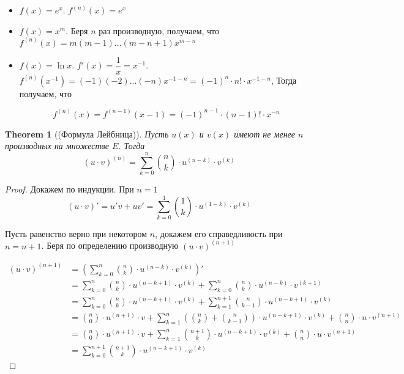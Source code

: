 \documentclass[a4paper]{article}
\theoremstyle{named}
\newtheorem*{namedtheorem}{Theorem}
\begin{document}
\begin{colloq}
\begin{itemize}
			\item
			$f(x) = e^x$. $f^{(n)}(x) = e^x$

			\item
			$f(x) = x^m$. Беря $n$ раз производную, получаем, что $f^{(n)}(x) = m(m - 1) \dots (m - n + 1)x^{m - n}$

			\item
			$f(x) = \ln x$. $f'(x) = \dfrac{1}{x} = x^{-1}$. $f^{(n)}(x^{-1}) = (-1)(-2)\dots(-n)x^{-1-n} = (-1)^n \cdot n! \cdot x^{-1 - n}$, Тогда получаем, что

			\begin{equation*}
				f^{(n)}(x) = f^{(n - 1)}(x - 1) = (-1)^{n - 1} \cdot (n - 1)! \cdot x^{-n}
			\end{equation*}
		\end{itemize}

		\begin{namedtheorem}[(Формула Лейбница)]
			Пусть $u(x)$ и $v(x)$ имеют не менее $n$ производных на множестве $E$. Тогда
			\begin{equation*}
				(u \cdot v)^{(n)} = \sum_{k = 0}^n \binom{n}{k} \cdot u^{(n - k)} \cdot v^{(k)}
			\end{equation*}
		\end{namedtheorem}

		\begin{proof}
			Докажем по индукции. При $n = 1$
			\begin{equation*}
				(u \cdot v)' = u'v + uv' = \sum_{k = 0}^1 \binom{1}{k} \cdot u^{(1 - k)} \cdot v^{(k)}
			\end{equation*}

			Пусть равенство верно при некотором $n$, докажем его справедливость при $n = n + 1$. Беря по определению производную $(u \cdot v)^{(n + 1)}$

			\begin{align*}
				(u \cdot v)^{(n + 1)} 
				&= \left(\sum_{k = 0}^n \binom{n}{k} \cdot u^{(n - k)} \cdot v^{(k)}\right)' \\
				&= \sum_{k = 0}^n \binom{n}{k} \cdot u^{(n - k + 1)} \cdot v^{(k)} + \sum_{k = 0}^n \binom{n}{k} \cdot u^{(n - k)} \cdot v^{(k + 1)} \\
				&= \sum_{k = 0}^n \binom{n}{k} \cdot u^{(n - k + 1)} \cdot v^{(k)} + \sum_{k = 1}^{n + 1} \binom{n}{k - 1} \cdot u^{(n - k + 1)} \cdot v^{(k)} \\
				&= \binom{n}{0} \cdot u^{(n + 1)} \cdot v + \sum_{k = 1}^n (\binom{n}{k} + \binom{n}{k - 1}) \cdot u^{(n - k + 1)} \cdot v^{(k)} + \binom{n}{n} \cdot u \cdot v^{(n + 1)} \\
				&= \binom{n}{0} \cdot u^{(n + 1)} \cdot v + \sum_{k = 1}^n \binom{n + 1}{k} \cdot u^{(n - k + 1)} \cdot v^{(k)} + \binom{n}{n} \cdot u \cdot v^{(n + 1)} \\
				&= \sum_{k = 0}^{n + 1} \binom{n + 1}{k} \cdot u^{(n - k + 1)} \cdot v^{(k)}
			\end{align*}


\end{proof}
\end{colloq}
\end{document}
